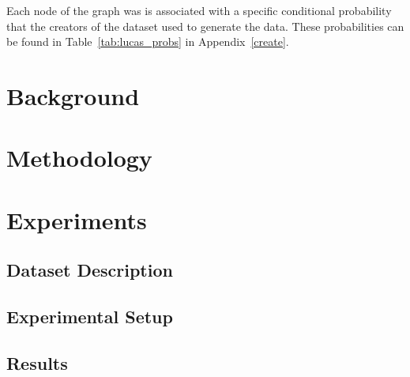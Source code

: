 \documentclass{article}
\begin{document}
Each node of the graph was is associated with a specific conditional probability that the
creators of the dataset used to generate the data. These probabilities can be found in Table~\ref{tab:lucas_probs}
in Appendix~\ref{create}.






\section{Background}


\section{Methodology}


\section{Experiments}


\subsection{Dataset Description}


\subsection{Experimental Setup}


\subsection{Results}

\end{document}
